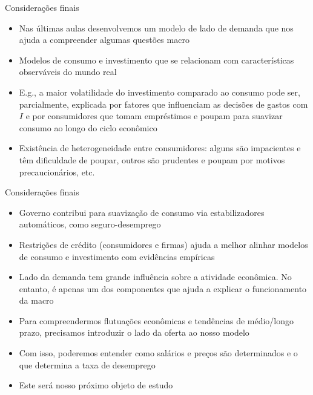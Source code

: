 \documentclass[10pt]{beamer}
\begin{document}
\begin{frame}
    {Considerações finais}
    \begin{itemize}
        \item Nas últimas aulas desenvolvemos um modelo de lado de demanda que nos ajuda a compreender algumas questões macro\bigskip
        \item Modelos de consumo e investimento que se relacionam com características observáveis do mundo real\bigskip
        \item E.g., a maior volatilidade do investimento comparado ao consumo pode ser, parcialmente, explicada por fatores que influenciam as decisões de gastos com $I$ e por consumidores que tomam empréstimos e poupam para suavizar consumo ao longo do ciclo econômico\bigskip
        \item Existência de heterogeneidade entre consumidores: alguns são impacientes e têm dificuldade de poupar, outros são prudentes e poupam por motivos precaucionários, etc.
    \end{itemize}
\end{frame}

\begin{frame}
    {Considerações finais}
    \begin{itemize}
        \item Governo contribui para suavização de consumo via estabilizadores automáticos, como seguro-desemprego\bigskip
        \item Restrições de crédito (consumidores e firmas) ajuda a melhor alinhar modelos de consumo e investimento com evidências empíricas\bigskip
        \item Lado da demanda tem grande influência sobre a atividade econômica. No entanto, é apenas um dos componentes que ajuda a explicar o funcionamento da macro\bigskip
        \item Para compreendermos flutuações econômicas e tendências de médio/longo prazo, precisamos introduzir o lado da oferta ao nosso modelo\bigskip
        \item Com isso, poderemos entender como salários e preços são determinados e o que determina a taxa de desemprego\bigskip
        \item Este será nosso próximo objeto de estudo
    \end{itemize} 
\end{frame}
\end{document}
